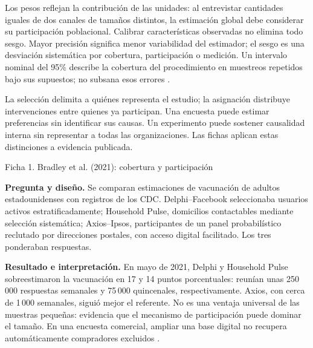 Los pesos reflejan la contribución de las unidades: al entrevistar cantidades iguales de dos canales de tamaños distintos, la estimación global debe considerar su participación poblacional. Calibrar características observadas no elimina todo sesgo. Mayor precisión significa menor variabilidad del estimador; el sesgo es una desviación sistemática por cobertura, participación o medición. Un intervalo nominal del 95\% describe la cobertura del procedimiento en muestreos repetidos bajo sus supuestos; no subsana esos errores \citep{holmesBusiness2023,bradley2021}.

La selección delimita a quiénes representa el estudio; la asignación distribuye intervenciones entre quienes ya participan. Una encuesta puede estimar preferencias sin identificar sus causas. Un experimento puede sostener causalidad interna sin representar a todas las organizaciones. Las fichas aplican estas distinciones a evidencia publicada.

\begin{fichainvestigacion}{Ficha 1. Bradley et al. (2021): cobertura y participación}

\textbf{Pregunta y diseño.} Se comparan estimaciones de vacunación de adultos estadounidenses con registros de los CDC. Delphi--Facebook seleccionaba usuarios activos estratificadamente; Household Pulse, domicilios contactables mediante selección sistemática; Axios--Ipsos, participantes de un panel probabilístico reclutado por direcciones postales, con acceso digital facilitado. Los tres ponderaban respuestas.

\textbf{Resultado e interpretación.} En mayo de 2021, Delphi y Household Pulse sobreestimaron la vacunación en 17 y 14 puntos porcentuales: reunían unas 250\,000 respuestas semanales y 75\,000 quincenales, respectivamente. Axios, con cerca de 1\,000 semanales, siguió mejor el referente. No es una ventaja universal de las muestras pequeñas: evidencia que el mecanismo de participación puede dominar el tamaño. En una encuesta comercial, ampliar una base digital no recupera automáticamente compradores excluidos \citep{bradley2021}.
\end{fichainvestigacion}

